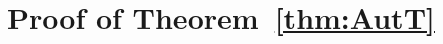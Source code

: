 \documentclass[onecolumn]{IEEEtran} %
\newcommand{\1}{\mathbbm{1}}
\theoremstyle{boldremark}
\begin{document}




\section{Proof of Theorem~\ref{thm:AutT}}
\label{APP_proof_thm:AutT}
\end{document}
